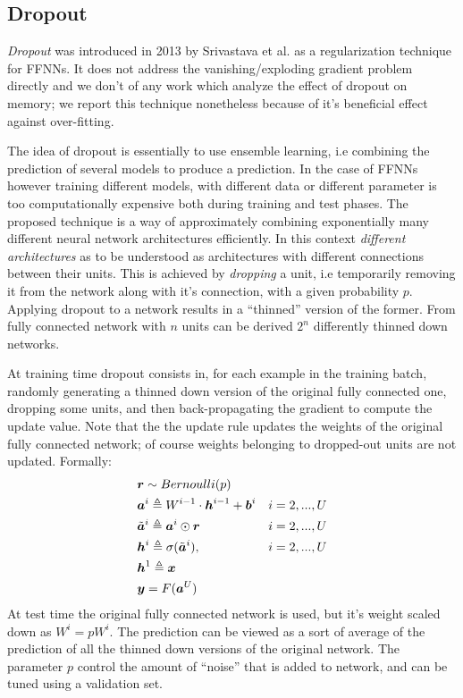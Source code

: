 \subsection{Dropout} 

\textit{Dropout} was introduced in 2013 by Srivastava et al. \cite{dropout} as a regularization technique for FFNNs. It does not address the vanishing/exploding gradient problem directly and we don't of any work which analyze the effect of dropout on memory; we report this technique nonetheless because of it's beneficial effect against over-fitting.

The idea of dropout is essentially to use ensemble learning, i.e combining the prediction of several models to produce a prediction. In the case of FFNNs however training different models, with different data or different parameter is too computationally expensive both during training and test phases.
The proposed technique is a way of approximately combining exponentially many different neural network architectures efficiently. In this context \textit{different architectures} as to be understood as architectures with different connections between their units. This is achieved by \textit{dropping} a unit, i.e temporarily removing it from the network along with it's connection, with a given probability $p$. Applying dropout to a network results in a ``thinned'' version of the former. From fully connected network with $n$ units can be derived $2^n$ differently thinned down networks.

At training time dropout consists in, for each example in the training batch, randomly generating a thinned down version of the original fully connected one, dropping some units, and then back-propagating the gradient to compute the update value. Note that the the update rule updates the weights of the original fully connected network; of course weights belonging to dropped-out units are not updated. Formally:
\begin{align}
&\boldsymbol{r} \sim Bernoulli(p)&\\
&\boldsymbol{a}^{i} \triangleq W^{i-1} \cdot \boldsymbol{h}^{i-1} +\boldsymbol{b}^i  & i=2,...,U\\
&\tilde{\boldsymbol{a}}^{i} \triangleq \boldsymbol{a}^i \odot \boldsymbol{r} & i=2,...,U\\
&\boldsymbol{h}^{i} \triangleq \sigma(\tilde{\boldsymbol{a}}^{i}), & i=2,...,U\\
&\boldsymbol{h}^{1} \triangleq \boldsymbol{x} &\\
&\boldsymbol{y}=F(\boldsymbol{a}^{U}) &
\end{align}
At test time the original fully connected network is used, but it's weight scaled down as $W^{i} = pW^{i}$. The prediction can be viewed as a sort of average of the prediction of all the thinned down versions of the original network. The parameter $p$ control the amount of ``noise'' that is added to network, and can be tuned using a validation set.

